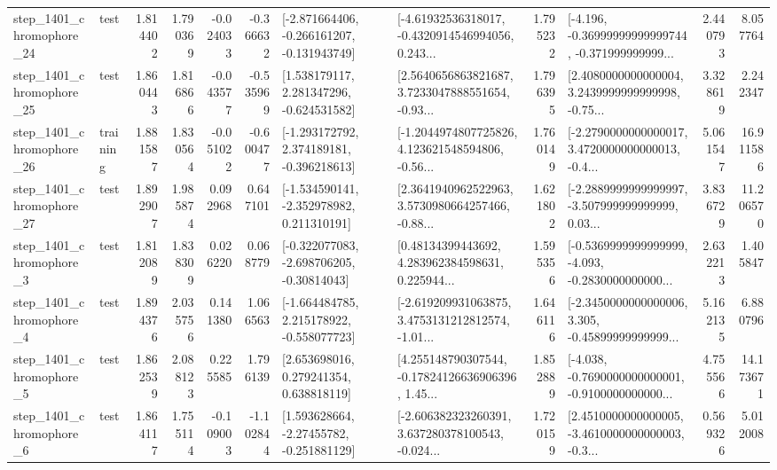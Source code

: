 \begin{tabular}{llrrrrllrlrr}
 step\_1401\_chromophore\_24 &      test &      1.814402 &    1.790369 &     -0.024033 & -0.366632 &  [-2.871664406, -0.266161207, -0.131943749] &  [-4.61932536318017, -0.4320914546994056, 0.243... &       1.795232 &  [-4.196, -0.36999999999999744, -0.371999999999... &            2.440793 &          8.057764 \\
 step\_1401\_chromophore\_25 &      test &      1.860443 &    1.816866 &     -0.043577 & -0.535969 &    [1.538179117, 2.281347296, -0.624531582] &  [2.5640656863821687, 3.7233047888551654, -0.93... &       1.796395 &  [2.4080000000000004, 3.2439999999999998, -0.75... &            3.328619 &          2.242347 \\
 step\_1401\_chromophore\_26 &  training &      1.881587 &    1.830564 &     -0.051022 & -0.600477 &   [-1.293172792, 2.374189181, -0.396218613] &  [-1.2044974807725826, 4.123621548594806, -0.56... &       1.760149 &  [-2.2790000000000017, 3.4720000000000013, -0.4... &            5.061547 &         16.911586 \\
 step\_1401\_chromophore\_27 &      test &      1.892907 &    1.985874 &      0.092968 &  0.647101 &   [-1.534590141, -2.352978982, 0.211310191] &  [2.3641940962522963, 3.5730980664257466, -0.88... &       1.621802 &  [-2.2889999999999997, -3.507999999999999, 0.03... &            3.836729 &         11.206570 \\
  step\_1401\_chromophore\_3 &      test &      1.812089 &    1.838309 &      0.026220 &  0.068779 &   [-0.322077083, -2.698706205, -0.30814043] &  [0.48134399443692, 4.283962384598631, 0.225944... &       1.595356 &  [-0.5369999999999999, -4.093, -0.2830000000000... &            2.632213 &          1.405847 \\
  step\_1401\_chromophore\_4 &      test &      1.894376 &    2.035756 &      0.141380 &  1.066563 &   [-1.664484785, 2.215178922, -0.558077723] &  [-2.619209931063875, 3.4753131212812574, -1.01... &       1.646116 &  [-2.3450000000000006, 3.305, -0.45899999999999... &            5.162135 &          6.880796 \\
  step\_1401\_chromophore\_5 &      test &      1.862539 &    2.088123 &      0.225585 &  1.796139 &     [2.653698016, 0.279241354, 0.638818119] &  [4.255148790307544, -0.17824126636906396, 1.45... &       1.852889 &  [-4.038, -0.7690000000000001, -0.9100000000000... &            4.755566 &         14.173671 \\
  step\_1401\_chromophore\_6 &      test &      1.864117 &    1.755114 &     -0.109003 & -1.102844 &    [1.593628664, -2.27455782, -0.251881129] &  [-2.606382323260391, 3.637280378100543, -0.024... &       1.720159 &  [2.4510000000000005, -3.4610000000000003, -0.3... &            0.569326 &          5.012008 \\

\end{tabular}
